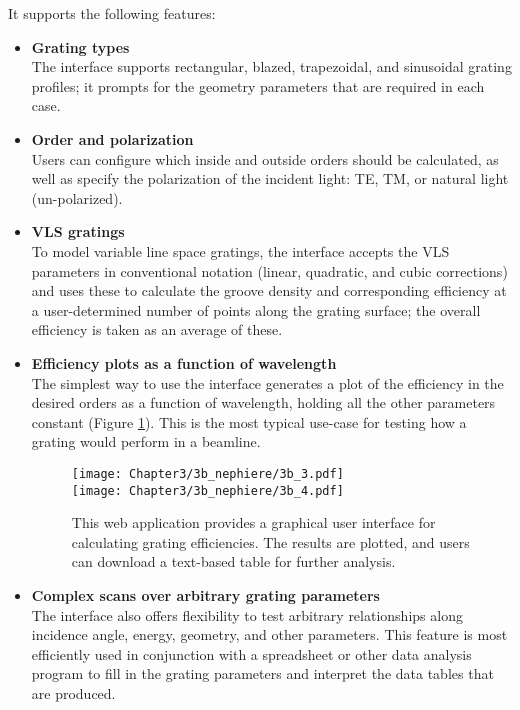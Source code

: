 It supports the following features:
\begin{itemize}
\item \textbf{Grating types}\\
The interface supports rectangular, blazed, trapezoidal, and sinusoidal grating profiles; it prompts for the geometry parameters that are required in each case.

\item \textbf{Order and polarization}\\
Users can configure which inside and outside orders should be calculated, as well as specify the polarization of the incident light: TE, TM, or natural light (un-polarized).

\item \textbf{VLS gratings}\\
To model variable line space gratings, the interface accepts the VLS parameters in conventional notation (linear, quadratic, and cubic corrections) and uses these to calculate the groove density and corresponding efficiency at a user-determined number of points along the grating surface; the overall efficiency is taken as an average of these.

\item \textbf{Efficiency plots as a function of wavelength}\\
The simplest way to use the interface generates a plot of the efficiency in the desired orders as a function of wavelength, holding all the other parameters constant (Figure \ref{3b_3}).  This is the most typical use-case for testing how a grating would perform in a beamline.

\begin{figure}[p] %
   \centering
   \vspace*{-.5in}
   \texttt{[image: Chapter3/3b\_nephiere/3b\_3.pdf]} \\
   \texttt{[image: Chapter3/3b\_nephiere/3b\_4.pdf]}
   \caption{This web application provides a graphical user interface for calculating grating efficiencies. The results are plotted, and users can download a text-based table for further analysis.}
   \label{3b_3}
\end{figure}

\item \textbf{Complex scans over arbitrary grating parameters}\\
The interface also offers flexibility to test arbitrary relationships along incidence angle, energy, geometry, and other parameters. This feature is most efficiently used in conjunction with a spreadsheet or other data analysis program to fill in the grating parameters and interpret the data tables that are produced.


\end{itemize}
